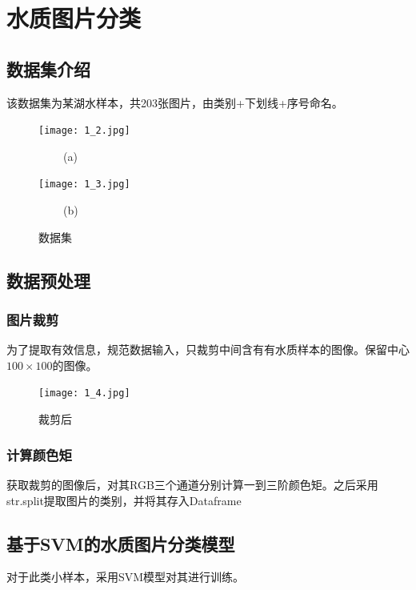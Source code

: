 \documentclass[withoutpreface,bwprint]{cumcmthesis} %
\title{}
\begin{document}
 
\newpage

\tableofcontents

\newpage
\section{水质图片分类}
\subsection{数据集介绍}
\par 该数据集为某湖水样本，共203张图片，由类别+下划线+序号命名。
\begin{figure}[H]
	\centering
	\begin{minipage}[t]{0.48\textwidth}
		\centering
		\texttt{[image: 1\_2.jpg]}
		\centerline{$\ \ \ \ \ \ \ \ \ \ $(a)}
	\end{minipage}
	\begin{minipage}[t]{0.48\textwidth}
		\centering
		\texttt{[image: 1\_3.jpg]}
		\centerline{$\ \ \ \ \ \ \ \ \ \ $(b)}
	\end{minipage}
	
	\caption{数据集}
\end{figure}

\subsection{数据预处理}


\subsubsection{图片裁剪}
\par 为了提取有效信息，规范数据输入，只裁剪中间含有有水质样本的图像。保留中心$100\times 100$的图像。
\begin{figure}[H]
	\centering
	\centerline{\texttt{[image: 1\_4.jpg]}}  
	\begin{center}
		\caption{裁剪后}
	\end{center}
\end{figure}
\subsubsection{计算颜色矩}
\par 获取裁剪的图像后，对其RGB三个通道分别计算一到三阶颜色矩。之后采用str.split提取图片的类别，并将其存入Dataframe


\subsection{基于SVM的水质图片分类模型}
\par 对于此类小样本，采用SVM模型对其进行训练。	
\end{document}
